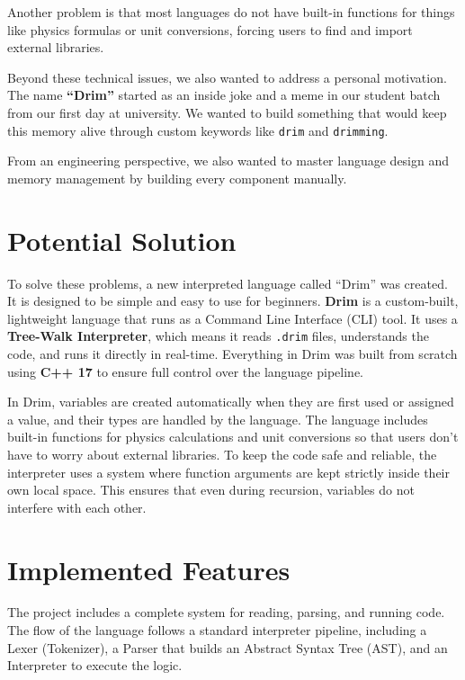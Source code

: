 \documentclass[12pt, a4paper]{article}
\begin{document}
\vspace{0.4cm}

Another problem is that most languages do not have built-in functions for things like physics formulas or unit conversions, forcing users to find and import external libraries. 

\vspace{0.4cm}

Beyond these technical issues, we also wanted to address a personal motivation. The name \textbf{“Drim”} started as an inside joke and a meme in our student batch from our first day at university. We wanted to build something that would keep this memory alive through custom keywords like \texttt{drim} and \texttt{drimming}. 

\vspace{0.4cm}

From an engineering perspective, we also wanted to master language design and memory management by building every component manually.

\vspace{1cm}

\section{Potential Solution}
To solve these problems, a new interpreted language called ``Drim'' was created. It is designed to be simple and easy to use for beginners. \textbf{Drim} is a custom-built, lightweight language that runs as a Command Line Interface (CLI) tool. It uses a \textbf{Tree-Walk Interpreter}, which means it reads \texttt{.drim} files, understands the code, and runs it directly in real-time. Everything in Drim was built from scratch using \textbf{C++ 17} to ensure full control over the language pipeline.

\vspace{0.4cm}

In Drim, variables are created automatically when they are first used or assigned a value, and their types are handled by the language. The language includes built-in functions for physics calculations and unit conversions so that users don't have to worry about external libraries. To keep the code safe and reliable, the interpreter uses a system where function arguments are kept strictly inside their own local space. This ensures that even during recursion, variables do not interfere with each other.

\newpage

\section{Implemented Features}
The project includes a complete system for reading, parsing, and running code. The flow of the language follows a standard interpreter pipeline, including a Lexer (Tokenizer), a Parser that builds an Abstract Syntax Tree (AST), and an Interpreter to execute the logic.
\end{document}

